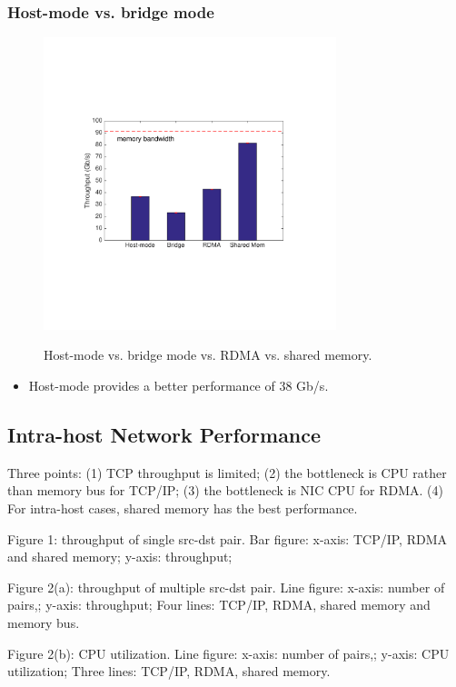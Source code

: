 \subsubsection{Host-mode vs. bridge mode}

\begin{figure}[!ht]
     \centering 
     \includegraphics[width=3.35in]{figures/motivation/eval_bw_host_bridge.pdf} 
     \label{fig:eval_bw_host_bridge}
     \caption{ Host-mode vs. bridge mode vs. RDMA vs. shared memory.} 
\end{figure} 

\begin{itemize}
  \item Host-mode provides a better performance of 38 Gb/s. 
\end{itemize}

\subsection{Intra-host Network Performance}


Three points: (1) TCP throughput is limited; (2) the bottleneck is CPU rather than memory bus for TCP/IP; (3) the bottleneck is NIC CPU for RDMA. (4) For intra-host cases, shared memory has the best performance.

Figure 1: throughput of single src-dst pair. Bar figure: x-axis: TCP/IP, RDMA and shared memory; y-axis: throughput;

Figure 2(a): throughput of multiple src-dst pair. Line figure: x-axis: number of pairs,; y-axis: throughput; Four lines: TCP/IP, RDMA, shared memory and memory bus.

Figure 2(b): CPU utilization. Line figure: x-axis: number of pairs,; y-axis: CPU utilization; Three lines: TCP/IP, RDMA, shared memory.

